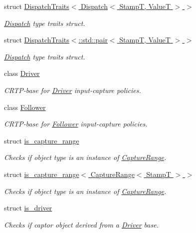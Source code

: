 \begin{DoxyCompactItemize}
struct \hyperlink{structflow_1_1_dispatch_traits_3_01_dispatch_3_01_stamp_t_00_01_value_t_01_4_01_4}{Dispatch\+Traits$<$ Dispatch$<$ Stamp\+T, Value\+T $>$ $>$}
\begin{DoxyCompactList}\small\item\em \hyperlink{classflow_1_1_dispatch}{Dispatch} type traits struct. \end{DoxyCompactList}\item 
struct \hyperlink{structflow_1_1_dispatch_traits_3_1_1std_1_1pair_3_01_stamp_t_00_01_value_t_01_4_01_4}{Dispatch\+Traits$<$\+::std\+::pair$<$ Stamp\+T, Value\+T $>$ $>$}
\begin{DoxyCompactList}\small\item\em \hyperlink{classflow_1_1_dispatch}{Dispatch} type traits struct. \end{DoxyCompactList}\item 
class \hyperlink{classflow_1_1_driver}{Driver}
\begin{DoxyCompactList}\small\item\em C\+R\+T\+P-\/base for \hyperlink{classflow_1_1_driver}{Driver} input-\/capture policies. \end{DoxyCompactList}\item 
class \hyperlink{classflow_1_1_follower}{Follower}
\begin{DoxyCompactList}\small\item\em C\+R\+T\+P-\/base for \hyperlink{classflow_1_1_follower}{Follower} input-\/capture policies. \end{DoxyCompactList}\item 
struct \hyperlink{structflow_1_1is__capture__range}{is\+\_\+capture\+\_\+range}
\begin{DoxyCompactList}\small\item\em Checks if object type is an instance of \hyperlink{structflow_1_1_capture_range}{Capture\+Range}. \end{DoxyCompactList}\item 
struct \hyperlink{structflow_1_1is__capture__range_3_01_capture_range_3_01_stamp_t_01_4_01_4}{is\+\_\+capture\+\_\+range$<$ Capture\+Range$<$ Stamp\+T $>$ $>$}
\begin{DoxyCompactList}\small\item\em Checks if object type is an instance of \hyperlink{structflow_1_1_capture_range}{Capture\+Range}. \end{DoxyCompactList}\item 
struct \hyperlink{structflow_1_1is__driver}{is\+\_\+driver}
\begin{DoxyCompactList}\small\item\em Checks if captor object derived from a \hyperlink{classflow_1_1_driver}{Driver} base. \end{DoxyCompactList}\item 

\end{DoxyCompactItemize}
